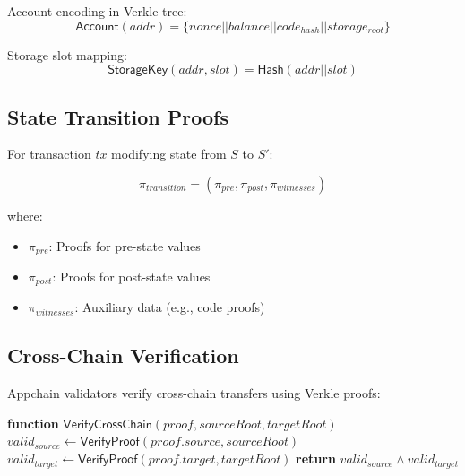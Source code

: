 Account encoding in Verkle tree:
\begin{equation}
    \mathsf{Account}(addr) = \{nonce || balance || code_{hash} || storage_{root}\}
\end{equation}

Storage slot mapping:
\begin{equation}
    \mathsf{StorageKey}(addr, slot) = \mathsf{Hash}(addr || slot)
\end{equation}

\subsection{State Transition Proofs}

For transaction $tx$ modifying state from $S$ to $S'$:

\begin{equation}
    \pi_{transition} = (\pi_{pre}, \pi_{post}, \pi_{witnesses})
\end{equation}

where:
\begin{itemize}
    \item $\pi_{pre}$: Proofs for pre-state values
    \item $\pi_{post}$: Proofs for post-state values
    \item $\pi_{witnesses}$: Auxiliary data (e.g., code proofs)
\end{itemize}

\subsection{Cross-Chain Verification}

Appchain validators verify cross-chain transfers using Verkle proofs:

\begin{algorithmic}[1]
\STATE \textbf{function} $\mathsf{VerifyCrossChain}(proof, sourceRoot, targetRoot)$
\STATE $valid_{source} \gets \mathsf{VerifyProof}(proof.source, sourceRoot)$
\STATE $valid_{target} \gets \mathsf{VerifyProof}(proof.target, targetRoot)$
\STATE \textbf{return} $valid_{source} \land valid_{target}$
\end{algorithmic}

